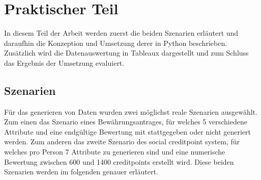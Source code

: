 \chapter{Praktischer Teil}
\label{sec:praktischerteil}
\begin{onehalfspace}
In diesem Teil der Arbeit werden zuerst die beiden Szenarien erläutert und daraufhin die Konzeption und Umsetzung derer in Python beschrieben. Zusätzlich wird die Datenauswertung in Tableaux dargestellt und zum Schluss das Ergebnis der Umsetzung evaluiert.
\section{Szenarien}
\label{subsec:szenarien}
Für das generieren von Daten wurden zwei möglichst reale Szenarien ausgewählt. Zum einen das Szenario eines Bewährungsantrages, für welches 5 verschiedene Attribute und eine endgültige Bewertung mit stattgegeben oder nicht generiert werden. Zum anderen das zweite Szenario des social creditpoint system, für welches pro Person 7 Attribute zu generieren sind und eine numerische Bewertung zwischen 600 und 1400 creditpoints erstellt wird. Diese beiden Szenarien werden im folgenden genauer erläutert.

\end{onehalfspace}
